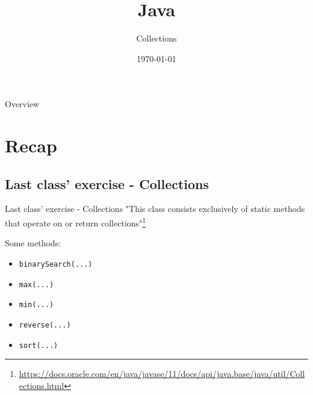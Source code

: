


\title{Java}
\subtitle{Collections}
\date{\today}


	
	\begin{frame}
		\titlepage
	\end{frame}
	
	\begin{frame}{Overview}
		\tableofcontents
	\end{frame}
	
	\section{Recap}
	\subsection{Last class' exercise - Collections}
	\begin{frame}{Last class' exercise - Collections}
		"This class consists exclusively of static methods that operate on or return collections"\footnote{\url{https://docs.oracle.com/en/java/javase/11/docs/api/java.base/java/util/Collections.html}}
		
		Some methods:
		\begin{itemize}
			\item \texttt{binarySearch(...)}
			\item \texttt{max(...)}
			\item \texttt{min(...)}
			\item \texttt{reverse(...)}
			\item \texttt{sort(...)}
		\end{itemize}
	\end{frame}
